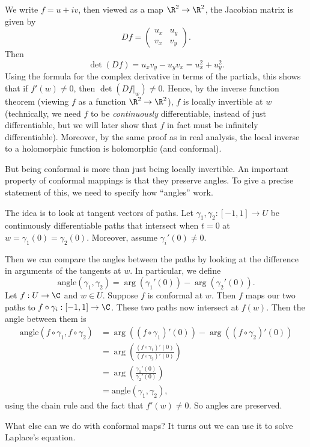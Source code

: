 \documentclass[a4paper]{article}
\begin{document}
We write $f = u + iv$, then viewed as a map $\R^2 \to \R^2$, the Jacobian matrix is given by
\[
  Df =
  \begin{pmatrix}
    u_x & u_y\\
    v_x & v_y
  \end{pmatrix}.
\]
Then
\[
  \det (Df) = u_x v_y - u_y v_x = u_x^2 + u_y^2.
\]
Using the formula for the complex derivative in terms of the partials, this shows that if $f'(w) \not= 0$, then $\det(Df|_w) \not= 0$. Hence, by the inverse function theorem (viewing $f$ as a function $\R^2 \to \R^2$), $f$ is locally invertible at $w$ (technically, we need $f$ to be \emph{continuously} differentiable, instead of just differentiable, but we will later show that $f$ in fact must be infinitely differentiable). Moreover, by the same proof as in real analysis, the local inverse to a holomorphic function is holomorphic (and conformal).

But being conformal is more than just being locally invertible. An important property of conformal mappings is that they preserve angles. To give a precise statement of this, we need to specify how ``angles'' work.

The idea is to look at tangent vectors of paths. Let $\gamma_1, \gamma_2: [-1, 1] \to U$ be continuously differentiable paths that intersect when $t = 0$ at $w = \gamma_1(0) = \gamma_2(0)$. Moreover, assume $\gamma_i'(0) \not= 0$.

Then we can compare the angles between the paths by looking at the difference in arguments of the tangents at $w$. In particular, we define
\[
  \mathrm{angle} (\gamma_1, \gamma_2) = \arg (\gamma_1'(0)) - \arg (\gamma_2'(0)).
\]
Let $f: U \to \C$ and $w \in U$. Suppose $f$ is conformal at $w$. Then $f$ maps our two paths to $f \circ \gamma_i: [-1, 1] \to \C$. These two paths now intersect at $f(w)$. Then the angle between them is
\begin{align*}
  \mathrm{angle} (f \circ \gamma_1, f\circ \gamma_2) &= \arg((f\circ \gamma_1)'(0)) - \arg((f \circ \gamma_2)'(0))\\
  &= \arg\left(\frac{(f\circ \gamma_1)'(0)}{(f \circ \gamma_2)'(0)}\right)\\
  &= \arg\left(\frac{\gamma_1'(0)}{\gamma_2'(0)}\right)\\
  &= \mathrm{angle} (\gamma_1, \gamma_2),
\end{align*}
using the chain rule and the fact that $f'(w) \not= 0$. So angles are preserved.

What else can we do with conformal maps? It turns out we can use it to solve Laplace's equation.
\end{document}
